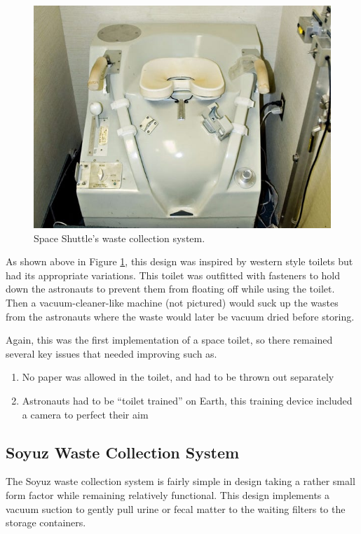     \begin{figure}[h]
        \centering
        \includegraphics[width = \linewidth]{figs/space_shuttle_toilet.jpeg}
        \caption[Space Shuttle's Waste Collection System]{Space Shuttle's waste collection system.}
        \label{fig:sapce_shuttle_toilet}
    \end{figure}

    As shown above in Figure \ref{fig:sapce_shuttle_toilet}, this design was inspired by western style toilets but had its appropriate variations. This toilet was outfitted with fasteners to hold down the astronauts to prevent them from floating off while using the toilet. Then a vacuum-cleaner-like machine (not pictured) would suck up the wastes from the astronauts where the waste would later be vacuum dried before storing.

    Again, this was the first implementation of a space toilet, so there remained several key issues that needed improving such as.\cite{ref:space_shuttle}

    \begin{enumerate}
        \item No paper was allowed in the toilet, and had to be thrown out separately
        \item Astronauts had to be ``toilet trained'' on Earth, this training device included a camera to perfect their aim
    \end{enumerate}


    \pagebreak
    \subsection{Soyuz Waste Collection System}
    The Soyuz waste collection system is fairly simple in design taking a rather small form factor while remaining relatively functional. This design implements a vacuum suction to gently pull urine or fecal matter to the waiting filters to the storage containers.

